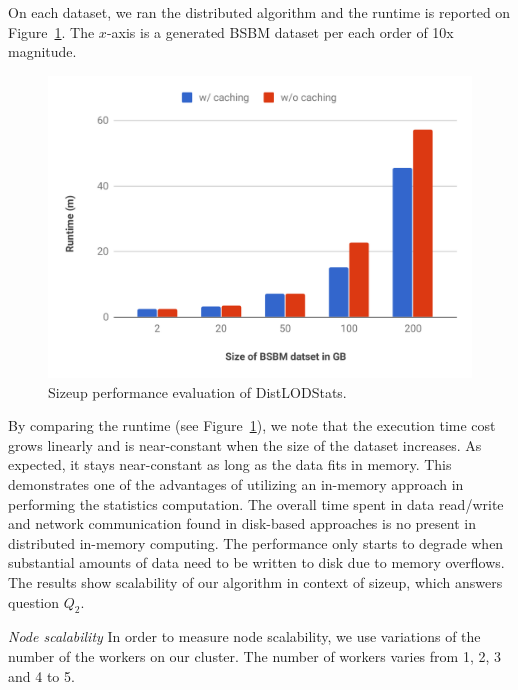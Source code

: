 On each dataset, we ran the distributed algorithm and the runtime is reported on Figure~\ref{fig:Sizeup}.
The $x$-axis is a generated BSBM dataset per each order of 10x magnitude.

\begin{figure}
 \includegraphics[width=1.0\columnwidth]{images/4_distlodstats/distlodstats-sizeup-performance.pdf}
\caption{Sizeup performance evaluation of DistLODStats.}
\label{fig:Sizeup}
\end{figure}

By comparing the runtime (see Figure~\ref{fig:Sizeup}), we note that the execution time cost grows linearly and is near-constant when the size of the dataset increases.
As expected, it stays near-constant as long as the data fits in memory.
This demonstrates one of the advantages of utilizing an in-memory approach in performing the statistics computation.
The overall time spent in data read/write and network communication found in disk-based approaches is no present in distributed in-memory computing. 
The performance only starts to degrade when substantial amounts of data need to be written to disk due to memory overflows. 
The results show scalability of our algorithm in context of sizeup, which answers question $Q_2$.

\noindent
\textit{Node scalability} In order to measure node scalability, we use variations of the number of the workers on our cluster.
The number of workers varies from 1, 2, 3 and 4 to 5.

